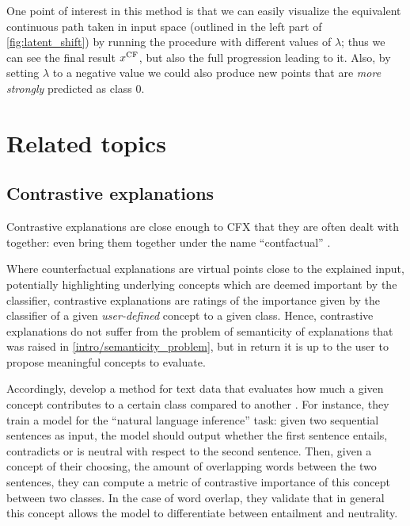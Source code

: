 \documentclass[../main.tex]{subfiles}
\begin{document}
One point of interest in this method is that we can easily visualize the equivalent continuous path taken in input space (outlined in the left part of \autoref{fig:latent_shift}) by running the procedure with different values of $\lambda$; thus we can see the final result $x^\mathrm{CF}$, but also the full progression leading to it.
Also, by setting $\lambda$ to a negative value we could also produce new points that are \emph{more strongly} predicted as class 0.


\section{Related topics}

\subsection{Contrastive explanations}

Contrastive explanations are close enough to CFX that they are often dealt with together: \citeauthor{stepinSurvey2021} even bring them together under the name ``contfactual'' \cite{stepinSurvey2021}.

Where counterfactual explanations are virtual points close to the explained input, potentially highlighting underlying concepts which are deemed important by the classifier, contrastive explanations are ratings of the importance given by the classifier of a given \emph{user-defined} concept to a given class.
Hence, contrastive explanations do not suffer from the problem of semanticity of explanations that was raised in \autoref{intro/semanticity_problem}, but in return it is up to the user to propose meaningful concepts to evaluate.

Accordingly, \citeauthor{jacoviContrastive2021} develop a method for text data that evaluates how much a given concept contributes to a certain class compared to another \cite{jacoviContrastive2021}.
For instance, they train a model for the ``natural language inference'' task: given two sequential sentences as input, the model should output whether the first sentence entails, contradicts or is neutral with respect to the second sentence.
Then, given a concept of their choosing, \eg{} the amount of overlapping words between the two sentences, they can compute a metric of contrastive importance of this concept between two classes.
In the case of word overlap, they validate that in general this concept allows the model to differentiate between entailment and neutrality.
\end{document}

